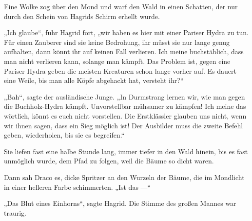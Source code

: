 Eine Wolke zog über den Mond und warf den Wald in einen Schatten, der nur durch den Schein von Hagrids Schirm erhellt wurde.

„Ich glaube“, fuhr Hagrid fort, „wir haben es hier mit einer Pariser Hydra zu tun. Für einen Zauberer sind sie keine Bedrohung, ihr müsst sie nur lange genug aufhalten, dann könnt ihr auf keinen Fall verlieren. Ich meine buchstäblich, dass man nicht verlieren kann, solange man kämpft. Das Problem ist, gegen eine Pariser Hydra geben die meisten Kreaturen schon lange vorher auf. Es dauert eine Weile, bis man alle Köpfe abgehackt hat, versteht ihr?“

„Bah“, sagte der ausländische Junge.
„In Durmstrang lernen wir, wie man gegen die Buchholz-Hydra kämpft. Unvorstellbar mühsamer zu kämpfen! Ich meine das wörtlich, könnt es euch nicht vorstellen. Die Erstklässler glauben uns nicht, wenn wir ihnen sagen, dass ein Sieg möglich ist! Der Ausbilder muss die zweite Befehl geben, wiederholen, bis sie es begreifen.“%

Sie liefen fast eine halbe Stunde lang, immer tiefer in den Wald hinein, bis es fast unmöglich wurde, dem Pfad zu folgen, weil die Bäume so dicht waren.

Dann sah Draco es, dicke Spritzer an den Wurzeln der Bäume, die im Mondlicht in einer helleren Farbe schimmerten.
„Ist das —“

„Das Blut eines Einhorns“, sagte Hagrid. Die Stimme des großen Mannes war traurig.

